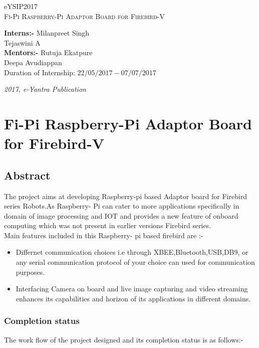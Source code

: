 \documentclass[a4paper,12pt,oneside]{book}
\begin{document}
	
	\begin{titlepage}
		\raggedright
		{\Large eYSIP2017\\[1cm]}
		{\Huge\scshape Fi-Pi Raspberry-Pi Adaptor Board for Firebird-V\\[.1in]}
		\vfill
		\begin{flushright}\textbf{Interns:-}
			{\large Milanpreet Singh \\}
			{\large Tejaswini A \\}\textbf{Mentors:-}
			{\large Rutuja Ekatpure \\}
			{\large Deepa Avudiappan \\}
			{\large Duration of Internship: $ 22/05/2017-07/07/2017 $ \\}
		\end{flushright}
		
		{\itshape 2017, e-Yantra Publication}
	\end{titlepage}
	
	\chapter[Project Tag]{Fi-Pi Raspberry-Pi Adaptor Board for Firebird-V}
	\section*{Abstract}
	The project aims at developing Raspberry-pi based Adaptor board for Firebird series Robots.As Raspberry- Pi can cater to more applications specifically in domain of image processing and IOT  and provides a new feature of onboard computing which was not present in earlier versions Firebird series.
	\\Main features included in this Raspberry- pi based firebird are :-\\
	\begin{itemize}
		\item Differnet communication choices i.e through XBEE,Bluetooth,USB,DB9, or any serial communication protocol of your choice can used for communication purposes.
		\item Interfacing Camera on board and live image capturing and video streaming enhances its capabilities and horizon of its applications in different domains.
	\end{itemize}
	\newpage
	\subsection*{Completion status}
	The work flow of the project designed and its completion status is as follows:-\\
	
\end{document}
